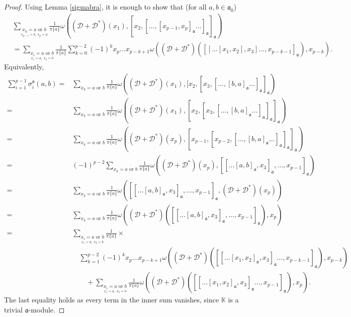 \documentclass[10pt,a4paper]{amsart}
\numberwithin{equation}{section}
\begin{document}
\begin{proof}
Using Lemma \ref{sigmabra}, it is enough to show that (for all $a,b\in \mathfrak{a}_{\bar 0}$)
\begin{align*}
 &\sum_{\underset{x_{p-1}=b,~x_p=a}{x_k=a \text{ or } b}}\frac{1}{\pi\{a\}}\omega( ({\mathscr D}+{\mathscr D}^*)(x_1),[x_2,[\dots ,[x_{p-1},x_p]_{\mathfrak{a}}\dots ]_{\mathfrak{a}}]_{\mathfrak{a}} )\\
 &= \sum_{\underset{x_1=a,~x_2=b}{x_i=a \text{ or } b}}\frac{1}{\pi\{a\}}\sum_{k=0}^{p-2}(-1)^kx_p\dots x_{p-k+1}\omega(({\mathscr D}+{\mathscr D}^*)([[\dots [x_1,x_2],x_3]\dots ,x_{p-k-1}]_{\mathfrak{a}}),x_{p-k}).
\end{align*}
Equivalently,
\begin{align*}
 \sum_{i=1}^{p-1}\sigma_i^{\mathfrak{a}}(a,b)
 =&\sum_{x_k=a \text{ or } b}\frac{1}{\pi\{a\}} \omega( ({\mathscr D}+{\mathscr D}^*)(x_1),[x_2,[x_3,[\dots ,[b,a]_{\mathfrak{a}}\dots ]_{\mathfrak{a}} ]_{\mathfrak{a}} )\\
 =&\sum_{x_k=a \text{ or } b}\frac{1}{\pi\{a\}} \omega( ({\mathscr D}+{\mathscr D}^*)(x_1),[x_2,[x_3,[\dots ,[b,a]_{\mathfrak{a}}\dots ]_{\mathfrak{a}} ]_{\mathfrak{a}} ]_{\mathfrak{a}} )\\
 =&\sum_{x_k=a \text{ or } b}\frac{1}{\pi\{a\}} \omega( ({\mathscr D}+{\mathscr D}^*)(x_p),[x_{p-1},[x_{p-2},[\dots ,[b,a]_{\mathfrak{a}}\dots ]_{\mathfrak{a}} ]_{\mathfrak{a}} ]_{\mathfrak{a}} )\\
 =&(-1)^{p-2}\sum_{x_k=a \text{ or } b}\frac{1}{\pi\{a\}} \omega( ({\mathscr D}+{\mathscr D}^*)(x_p),[[\dots [a,b]_{\mathfrak{a}},x_3]_{\mathfrak{a}},\dots ,x_{p-1}]_{\mathfrak{a}} )\\
 =&\sum_{x_k=a \text{ or } b}\frac{1}{\pi\{a\}} \omega( [[\dots [a,b]_{\mathfrak{a}},x_3]_{\mathfrak{a}},\dots ,x_{p-1}]_{\mathfrak{a}},({\mathscr D}+{\mathscr D}^*)(x_p) )\\
 =&\sum_{x_k=a \text{ or } b}\frac{1}{\pi\{a\}} \omega(({\mathscr D}+{\mathscr D}^*)( [[\dots [a,b]_{\mathfrak{a}},x_3]_{\mathfrak{a}},\dots ,x_{p-1}]_{\mathfrak{a}}),x_p )\\
 =&\sum_{\underset{x_1=a,~x_2=b}{x_i=a \text{ or } b}}\frac{1}{\pi\{a\}}\times\\
 &\quad\sum_{k=1}^{p-2}(-1)^kx_p\dots x_{p-k+1}\omega(({\mathscr D}+{\mathscr D}^*)([[\dots [x_1,x_2]_\mathfrak{a},x_3]_\mathfrak{a}\dots ,x_{p-k-1}]_{\mathfrak{a}}),x_{p-k})\\
 &\qquad+ \sum_{\underset{x_1=a,~x_2=b}{x_i=a \text{ or } b}}\frac{1}{\pi\{a\}}\omega(({\mathscr D}+{\mathscr D}^*)([[\dots [x_1,x_2]_\mathfrak{a},x_3]_\mathfrak{a}\dots ,x_{p-1}]_{\mathfrak{a}}),x_{p}).
\end{align*}
The last equality holds as every term in the inner sum  vanishes, since $\mathbb{K}$ is a trivial $\mathfrak{a}$-module.
\end{proof}
\end{document}
